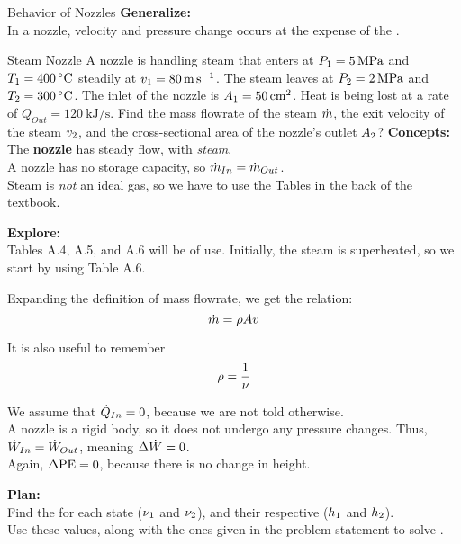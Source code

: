 \begin{example}{Behavior of Nozzles}
  \textbf{Generalize:} \\
  In a nozzle, velocity and pressure change occurs at the expense of the .
\end{example}

\begin{example}{Steam Nozzle}
  A nozzle is handling steam that enters at $P_{1} = \SI{5}{\mega\pascal}$ and $\Temp_{1} = \SI{400}{\degreeCelsius}$ steadily at $v_{1} = \SI{80}{\meter\per\second}$.
  The steam leaves at $P_{2} = \SI{2}{\mega\pascal}$ and $\Temp_{2} = \SI{300}{\degreeCelsius}$.
  The inlet of the nozzle is $A_{1} = \SI{50}{\centi\meter\squared}$.
  Heat is being lost at a rate of $Q_{Out} = \SI{120}{\kilo\joule\per\second}$.
  Find the mass flowrate of the steam $\dot{m}$, the exit velocity of the steam $v_{2}$, and the cross-sectional area of the nozzle's outlet $A_{2}$?
  \tcblower{}
  \textbf{Concepts:} \\
  The \textbf{nozzle} has steady flow, with \textit{steam}. \\
  A nozzle has no storage capacity, so $\dot{m}_{In} = \dot{m}_{Out}$. \\
  Steam is \emph{not} an ideal gas, so we have to use the Tables in the back of the textbook.

  \textbf{Explore:} \\
  Tables A.4, A.5, and A.6 will be of use.
  Initially, the steam is superheated, so we start by using Table A.6.

  Expanding the definition of mass flowrate, we get the relation:
  \begin{equation*}
    \dot{m} = \rho A v
  \end{equation*}

  It is also useful to remember
  \begin{equation*}
    \rho = \frac{1}{\nu}
  \end{equation*}

  We assume that $\dot{Q}_{In} = 0$, because we are not told otherwise. \\
  A nozzle is a rigid body, so it does not undergo any pressure changes.
  Thus, $\dot{W}_{In} = \dot{W}_{Out}$, meaning $\Delta \dot{W} = 0$. \\
  Again, $\Delta \mathrm{PE} = 0$, because there is no change in height.

  \textbf{Plan:} \\
  Find the  for each state ($\nu_{1}$ and $\nu_{2}$), and their respective  ($h_{1}$ and $h_{2}$). \\
  Use these values, along with the ones given in the problem statement to solve .


\end{example}
